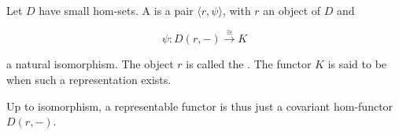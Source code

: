 Let $D$ have small hom-sets. A  is a pair $\langle r, \psi \rangle$, with $r$ an object of $D$ and

$$
\psi \colon D(r, -) \xrightarrow{\cong} K
$$

a natural isomorphism. The object $r$ is called the . The functor $K$ is said to be  when such a representation exists.

Up to isomorphism, a representable functor is thus just a covariant hom-functor $D(r, -)$.
